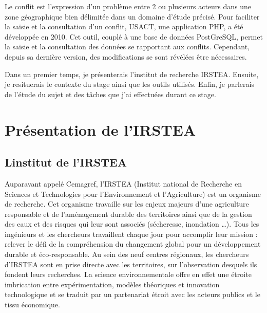 \documentclass[12pt,a4paper,titlepage,twoside]{report}
\begin{document}
Le conflit est l'expression d'un problème entre 2 ou plusieurs acteurs dans une zone géographique bien délimitée dans un domaine d'étude précisé. Pour faciliter la saisie et la consultation d'un conflit, USACT, une application PHP, a été développée en 2010. Cet outil, couplé à une base de données PostGreSQL, permet la saisie et la consultation des données se rapportant aux conflits. Cependant, depuis sa dernière version, des modifications se sont révélées être nécessaires. \newline


Dans un premier temps, je présenterais l'institut de recherche IRSTEA. Ensuite, je resituerais le contexte du stage ainsi que les outils utilisés. Enfin, je parlerais de l'étude du sujet et des tâches que j'ai effectuées durant ce stage.

\cleardoublepage
\chapter{Présentation de l'IRSTEA}
\section{Linstitut de l'IRSTEA}
Auparavant appelé Cemagref, l’IRSTEA (Institut national de Recherche en Sciences et Technologies pour l’Environnement et l’Agriculture) est un organisme de recherche. \newline\newline
Cet organisme travaille sur les enjeux majeurs d’une agriculture responsable et de l’aménagement durable des territoires ainsi que de la gestion des eaux et des risques qui leur sont associés (sécheresse, inondation …). Tous les ingénieurs et les chercheurs travaillent chaque jour pour accomplir leur mission : relever le défi de la compréhension du changement global pour un développement durable et éco-responsable. \newline
Au sein des neuf centres régionaux, les chercheurs d'IRSTEA sont en prise directe avec les territoires, sur l'observation desquels ils fondent leurs recherches. \newline\newline
La science environnementale offre en effet une étroite imbrication entre expérimentation, modèles théoriques et innovation technologique et se traduit par un partenariat étroit avec les acteurs publics et le tissu économique. 
\end{document}
